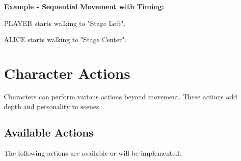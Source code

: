 \documentclass[11pt,letterpaper,oldstylefigures]{memoir}
\newcommand{\stagedir}[1]{#1\par\vspace{1\baselineskip}}
\newenvironment{FountainExample}
  {\begingroup
  \ttfamily\small
   \setlength{\parindent}{0pt}
  \setlength{\parskip}{0.5em}
  \allowdisplaybreaks
  \setlength{\displaywidowpenalty}{0}
  \setlength{\widowpenalty}{0}
  \setlength{\clubpenalty}{0}
  \setlength{\interlinepenalty}{0}
}
  {\endgroup}
\begin{document}
\textbf{Example - Sequential Movement with Timing:}
\begin{FountainExample}
\stagedir{PLAYER starts walking to "Stage Left".}
\stagedir{ALICE starts walking to "Stage Center".}

\section{Character Actions}
\label{sec:character-actions}

Characters can perform various actions beyond movement. These actions add depth and personality to scenes.

\subsection{Available Actions}

The following actions are available or will be implemented:


\end{FountainExample}
\end{document}
